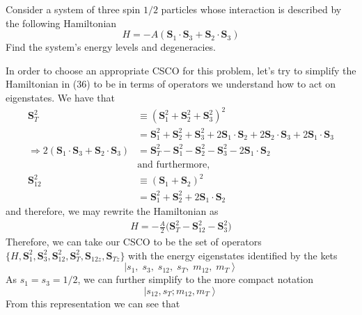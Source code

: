 \documentclass[a4paper, 11pt]{article}
\newcommand{\ket}[1]{\ensuremath{\left|#1\right\rangle}}
\newenvironment{solution}{%
	\begin{list}{}{%
			\setlength{\topsep}{0pt}%
			\setlength{\leftmargin}{0.5cm}%
			\setlength{\rightmargin}{0.5cm}%
			\setlength{\listparindent}{\parindent}%
			\setlength{\itemindent}{\parindent}%
			\setlength{\parsep}{\parskip}%
		}%
		\item[]}{\end{list}}
\begin{document}
\begin{enumerate}[leftmargin=0em]
  \item Consider a system of three spin $1/2$ particles whose interaction is
    described by the following Hamiltonian
    \begin{equation}
      H = -A\left( \mathbf{S}_1\cdot\mathbf{S}_3 +\mathbf{S}_2\cdot\mathbf{S}_3\right)
    \end{equation}
    Find the system's energy levels and degeneracies.
    \begin{solution}
      In order to choose an appropriate CSCO for this problem, let's try to
      simplify the Hamiltonian in (36) to be in terms of operators we understand
      how to act on eigenstates. We have that
      \begin{align}
        \mathbf{S}_T^2 &\equiv (\mathbf{S}_1^2+\mathbf{S}_2^2+\mathbf{S}_3^2)^2 \\
                       &= \mathbf{S}_1^2+\mathbf{S}_2^2+\mathbf{S}_3^2+2\mathbf{S}_1\cdot\mathbf{S}_2 +2\mathbf{S}_2\cdot\mathbf{S}_3+2\mathbf{S}_1\cdot\mathbf{S}_3 \\
        \Rightarrow 2\left( \mathbf{S}_1\cdot\mathbf{S}_3 +\mathbf{S}_2\cdot\mathbf{S}_3\right)&= \mathbf{S}_T^2-\mathbf{S}_1^2-\mathbf{S}_2^2-\mathbf{S}_3^2-2\mathbf{S}_1\cdot\mathbf{S}_2 \\
                       &\text{and furthermore,} \\
        \mathbf{S}_{12}^2 &\equiv \left(\mathbf{S}_1+\mathbf{S}_2\right)^2 \\
        &= \mathbf{S}_1^2+\mathbf{S}_2^2+2\mathbf{S}_1\cdot\mathbf{S}_2
      \end{align}
      and therefore, we may rewrite the Hamiltonian as 
      \begin{align}
        H = -\frac{A}{2}\Big(\mathbf{S}_T^2-\mathbf{S}_{12}^2-\mathbf{S}_3^2\Big)
      \end{align}
      Therefore, we can take our CSCO to be the set of operators $\{H,
      \mathbf{S}_1^2, \mathbf{S}_3^2, \mathbf{S}_{12}^2, \mathbf{S}_T^2,
      \mathbf{S}_{12z}, \mathbf{S}_{Tz}\}$ with the energy eigenstates
      identified by the kets
      \begin{equation}
        \ket{s_1,\; s_3,\; s_{12},\; s_T,\; m_{12},\; m_T}
      \end{equation}
      As $s_1=s_3=1/2$, we can further simplify to the more compact notation
      \begin{equation}
        \ket{s_{12}, s_T ; m_{12}, m_T}
      \end{equation}
      From this representation we can see that

\end{solution}
\end{enumerate}
\end{document}
